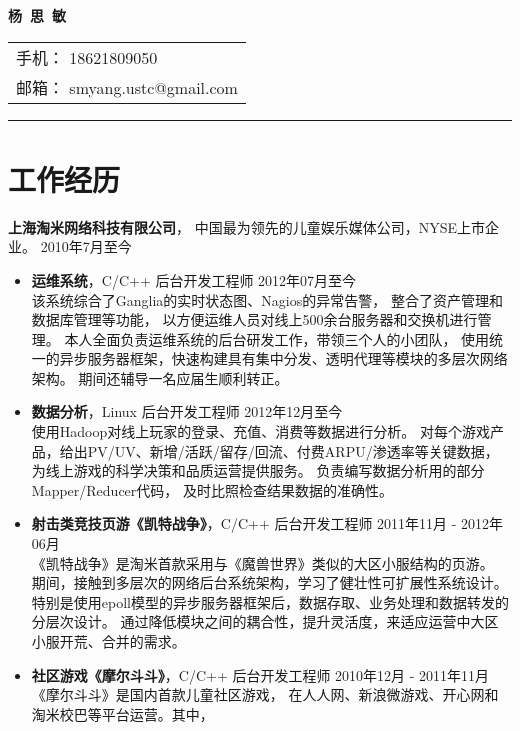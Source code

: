 \documentclass[margin]{res}
\newcommand{\taomee}{上海淘米网络科技有限公司}
\begin{document}
{\bfseries \huge 杨\ 思\ 敏}
\hfill
\begin{tabular}{l}
    手机： {18621809050}\\
    邮箱： {smyang.ustc@gmail.com}
\end{tabular}
\rule{\columnwidth}{1pt}


\section{\Large 工作经历}
{\bf \large \taomee}，
中国最为领先的儿童娱乐媒体公司，NYSE上市企业。
\hfill 2010年7月至今\\[1mm]
\begin{itemize}
    \item {\bf 运维系统}，C/C++ 后台开发工程师 
        \hfill 2012年07月至今\\[1mm]
        该系统综合了Ganglia的实时状态图、Nagios的异常告警，
        整合了资产管理和数据库管理等功能，
        以方便运维人员对线上500余台服务器和交换机进行管理。
        本人全面负责运维系统的后台研发工作，带领三个人的小团队，
        使用统一的异步服务器框架，快速构建具有集中分发、透明代理等模块的多层次网络架构。
        期间还辅导一名应届生顺利转正。
        \\
    \item {\bf 数据分析}，Linux 后台开发工程师
        \hfill 2012年12月至今\\[1mm]
        使用Hadoop对线上玩家的登录、充值、消费等数据进行分析。
        对每个游戏产品，给出PV/UV、新增/活跃/留存/回流、付费ARPU/渗透率等关键数据，
        为线上游戏的科学决策和品质运营提供服务。
        负责编写数据分析用的部分Mapper/Reducer代码，
        及时比照检查结果数据的准确性。
        \\
    \item {\bf 射击类竞技页游《凯特战争》}，C/C++ 后台开发工程师 
        \hfill 2011年11月 - 2012年06月\\[1mm]
        《凯特战争》是淘米首款采用与《魔兽世界》类似的大区小服结构的页游。
        期间，接触到多层次的网络后台系统架构，学习了健壮性可扩展性系统设计。
        特别是使用epoll模型的异步服务器框架后，数据存取、业务处理和数据转发的分层次设计。
        通过降低模块之间的耦合性，提升灵活度，来适应运营中大区小服开荒、合并的需求。
        \\
    \item {\bf 社区游戏《摩尔斗斗》}，C/C++ 后台开发工程师 
    \hfill 2010年12月 - 2011年11月\\[1mm]
        《摩尔斗斗》是国内首款儿童社区游戏，
        在人人网、新浪微游戏、开心网和淘米校巴等平台运营。其中，

\end{itemize}
\end{document}
